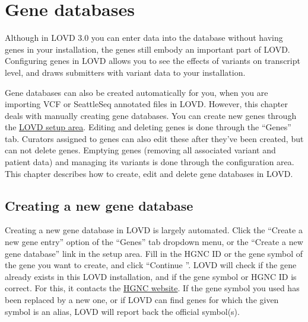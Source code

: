 \documentclass[a4paper,oneside,openany,12pt]{memoir}
\renewenvironment{leftbar}[1][\hsize]
{%
    \def\FrameCommand
    {%
        {\color{LOVDdark}\vrule width 3pt \hspace{5pt}}%
        \colorbox{LOVDlight}%
    }%
    \MakeFramed{\hsize#1\advance\hsize-\width\FrameRestore}%
}
{\endMakeFramed}
\begin{document}
\chapter{Gene databases}
Although in LOVD 3.0 you can enter data into the database without having genes in your installation, the genes still embody an important part of LOVD.
Configuring genes in LOVD allows you to see the effects of variants on transcript level, and draws submitters with variant data to your installation.
\par
Gene databases can also be created automatically for you, when you are importing VCF or SeattleSeq annotated files in LOVD.
However, this chapter deals with manually creating gene databases.
You can create new genes through the \hyperlink{c_setup}{LOVD setup area}.
Editing and deleting genes is done through the ``Genes'' tab.
Curators assigned to genes can also edit these after they've been created, but can not delete genes.
Emptying genes (removing all associated variant and patient data) and managing its variants is done through the configuration area.
This chapter describes how to create, edit and delete gene databases in LOVD.





\hypertarget{s_gene_create}{}
\section{Creating a new gene database}
Creating a new gene database in LOVD is largely automated.
Click the ``Create a new gene entry'' option of the ``Genes'' tab dropdown menu, or the ``Create a new gene database'' link in the setup area.
Fill in the HGNC ID or the gene symbol of the gene you want to create, and click ``Continue \guillemotright''.
LOVD will check if the gene already exists in this LOVD installation, and if the gene symbol or HGNC ID is correct.
For this, it contacts the \href{http://www.genenames.org/}{HGNC website}.
If the gene symbol you used has been replaced by a new one, or if LOVD can find genes for which the given symbol is an alias,
 LOVD will report back the official symbol(s).
\end{document}
